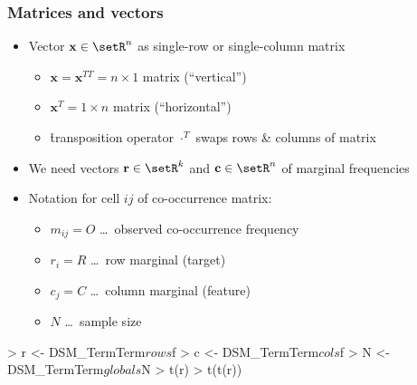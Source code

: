 \documentclass[t]{beamer} %
\begin{document}
\begin{frame}[fragile]
  \frametitle{Matrices and vectors}

  \ungap[1]
  \begin{itemize}
  \item Vector $\mathbf{x}\in \setR^n$ as single-row or single-column matrix
    \begin{itemize}
    \item $\mathbf{x} = \mathbf{x}^{TT} = n\times 1$ matrix (``vertical'')
    \item $\mathbf{x}^T = 1\times n$ matrix (``horizontal'')
    \item \h{transposition} operator $\cdot^T$ swaps rows \& columns of matrix 
    \end{itemize}
  \item<2-> We need vectors $\mathbf{r} \in \setR^k$ and $\mathbf{c} \in \setR^n$ of marginal frequencies
  \item<2-> Notation for cell $ij$ of co-occurrence matrix:
    \begin{itemize}
    \item $m_{ij} = O$ \ldots\ observed co-occurrence frequency
    \item $r_i = R$ \ldots\ row marginal (target)
    \item $c_j = C$ \ldots\ column marginal (feature)
    \item $N$ \ldots\ sample size
    \end{itemize}
  \end{itemize}

\begin{Rcode}
> r <- DSM_TermTerm$rows$f
> c <- DSM_TermTerm$cols$f
> N <- DSM_TermTerm$globals$N
> t(r)    
> t(t(r))  
\end{Rcode} %
\end{frame}
\end{document}
